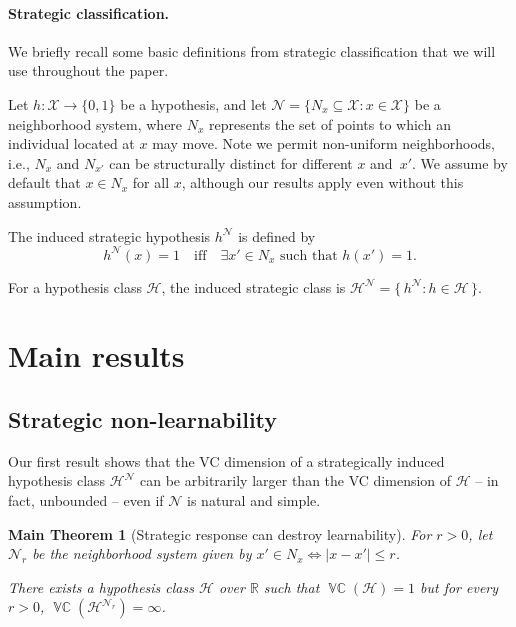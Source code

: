 \documentclass[11pt]{article}
\theoremstyle{plain}
\newtheorem{maintheorem}{Main Theorem}
\theoremstyle{definition}
\theoremstyle{remark}
\DeclareMathOperator{\VCdim}{\mathbb{VC}}
\begin{document}
\paragraph{Strategic classification.}
We briefly recall some basic definitions from strategic classification that we will use throughout the paper.

Let $h\colon \mathcal X\to\{0,1\}$ be a hypothesis, and let
$\mathcal N = \{N_x \subseteq \mathcal X : x\in\mathcal X\}$ be a
neighborhood system, where $N_x$ represents the set of points to which an
individual located at $x$ may move.
Note we permit non-uniform neighborhoods, i.e., $N_x$ and $N_{x'}$ can be structurally distinct for different $x$ and~$x'$.
We assume by default that
$x\in N_x$ for all $x$, although our results apply even without this assumption.


The induced strategic hypothesis $h^{\mathcal N}$ is defined by
\[
h^{\mathcal N}(x) = 1
\quad \text{iff} \quad
\exists x'\in N_x \text{ such that } h(x')=1.
\]

For a hypothesis class $\mathcal H$, the induced strategic class is
\(
\mathcal H^{\mathcal N}
=
\{\, h^{\mathcal N} : h\in \mathcal H \,\}.
\)





\section{Main results}
\label{sec:main-results}

\subsection{Strategic non-learnability}

Our first result shows that the VC dimension of a strategically induced hypothesis class $\mathcal H^\mathcal N$ can be arbitrarily larger than the VC dimension of $\mathcal H$ -- in fact, unbounded -- even if $\mathcal N$ is natural and simple.

\begin{maintheorem}[Strategic response can destroy learnability]
\label{main:vc-blowup}
For $r > 0$, let $\mathcal{N}_r$ be the neighborhood system given by $x' \in  N_{x} \iff |x - x'| \leq r$.

There exists a hypothesis class $\mathcal{H}$ over $\mathbb R$ such that $\VCdim(\mathcal H) = 1$ but for every $r > 0$, $\VCdim(\mathcal H^{\mathcal N_r}) = \infty$.
\end{maintheorem}
\end{document}
